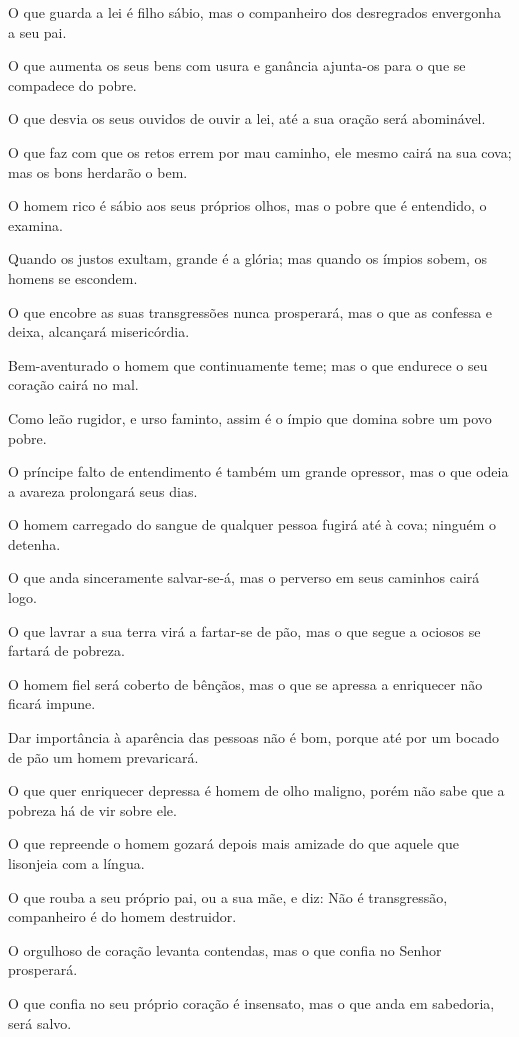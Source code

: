 O que guarda a lei é filho sábio, mas o companheiro dos
desregrados envergonha a seu pai.

O que aumenta os seus bens com usura e ganância ajunta-os para o
que se compadece do pobre.

O que desvia os seus ouvidos de ouvir a lei, até a sua oração será
abominável.

O que faz com que os retos errem por mau caminho, ele mesmo cairá
na sua cova; mas os bons herdarão o bem.

O homem rico é sábio aos seus próprios olhos, mas o pobre que é
entendido, o examina.

Quando os justos exultam, grande é a glória; mas quando os ímpios
sobem, os homens se escondem.

O que encobre as suas transgressões nunca prosperará, mas o que
as confessa e deixa, alcançará misericórdia.

Bem-aventurado o homem que continuamente teme; mas o que endurece
o seu coração cairá no mal.

Como leão rugidor, e urso faminto, assim é o ímpio que domina
sobre um povo pobre.

O príncipe falto de entendimento é também um grande opressor, mas
o que odeia a avareza prolongará seus dias.

O homem carregado do sangue de qualquer pessoa fugirá até à cova;
ninguém o detenha.

O que anda sinceramente salvar-se-á, mas o perverso em seus
caminhos cairá logo.

O que lavrar a sua terra virá a fartar-se de pão, mas o que segue
a ociosos se fartará de pobreza.

O homem fiel será coberto de bênçãos, mas o que se apressa a
enriquecer não ficará impune.

Dar importância à aparência das pessoas não é bom, porque até por
um bocado de pão um homem prevaricará.

O que quer enriquecer depressa é homem de olho maligno, porém não
sabe que a pobreza há de vir sobre ele.

O que repreende o homem gozará depois mais amizade do que aquele
que lisonjeia com a língua.

O que rouba a seu próprio pai, ou a sua mãe, e diz: Não é
transgressão, companheiro é do homem destruidor.

O orgulhoso de coração levanta contendas, mas o que confia no
Senhor prosperará.

O que confia no seu próprio coração é insensato, mas o que anda
em sabedoria, será salvo.

